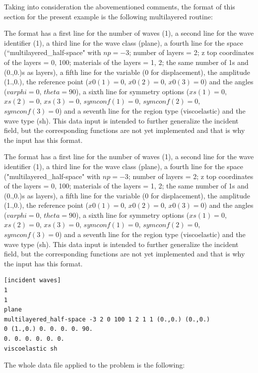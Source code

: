 \documentclass[a4]{article}
\begin{document}
Taking into consideration the abovementioned comments, the format of this section for the present example is the following multilayered routine:


The format has a first line for the number of waves (1), a second line for the wave identifier (1), a third line for the wave class (plane), a fourth line for the space (``multilayered\_half-space" with $np = -3$; number of layers = 2; z top coordinates of the layers = 0, 100; materials of the layers = 1, 2; the same number of 1s and (0.,0.)s as layers), a fifth line for the variable (0 for displacement), the amplitude (1.,0.), the reference point ($ x0(1) = 0 $, $ x0(2) = 0 $, $ x0(3) = 0 $)  and the angles ($ varphi = 0 $, $ theta = 90 $), a sixth line for symmetry options ($ xs(1) = 0 $, $ xs(2) = 0 $, $ xs(3) = 0 $, $ symconf(1) = 0 $, $ symconf(2) = 0 $, $ symconf(3) = 0 $) and a seventh line for the region type (viscoelastic) and the wave type (sh). This data input is intended to further generalize the incident field, but the corresponding functions are not yet implemented and that is why the input has this format. 

The format has a first line for the number of waves (1), a second line for the wave identifier (1), a third line for the wave class (plane), a fourth line for the space ("multilayered\_half-space" with $np = -3$; number of layers = 2; z top coordinates of the layers = 0, 100; materials of the layers = 1, 2; the same number of 1s and (0.,0.)s as layers), a fifth line for the variable (0 for displacement), the amplitude (1.,0.), the reference point ($ x0(1) = 0 $, $ x0(2) = 0 $, $ x0(3) = 0 $)  and the angles ($ varphi = 0 $, $ theta = 90 $), a sixth line for symmetry options ($ xs(1) = 0 $, $ xs(2) = 0 $, $ xs(3) = 0 $, $ symconf(1) = 0 $, $ symconf(2) = 0 $, $ symconf(3) = 0 $) and a seventh line for the region type (viscoelastic) and the wave type (sh). This data input is intended to further generalize the incident field, but the corresponding functions are not yet implemented and that is why the input has this format. 


\begin{Verbatim}
[incident waves]
1
1
plane
multilayered_half-space -3 2 0 100 1 2 1 1 (0.,0.) (0.,0.)
0 (1.,0.) 0. 0. 0. 0. 90.
0. 0. 0. 0. 0. 0.
viscoelastic sh
\end{Verbatim}

The whole data file applied to the problem is the following:
\end{document}
